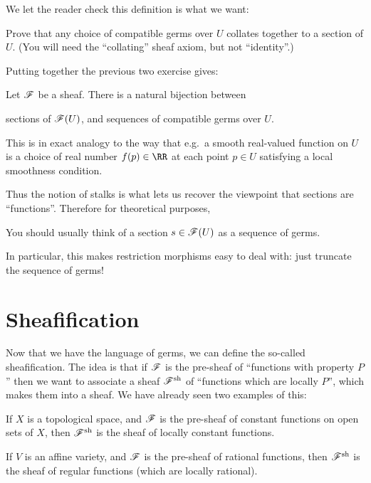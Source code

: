 \documentclass[11pt]{scrreprt}
\begin{document}
We let the reader check this definition is what we want:
\begin{exercise}
	Prove that any choice of compatible germs over $U$
	collates together to a section of $U$.
	(You will need the ``collating'' sheaf axiom, but not ``identity''.)
\end{exercise}

Putting together the previous two exercise gives:
\begin{theorem}
	Let $\mathscr F$ be a sheaf.
	There is a natural bijection between
	\begin{itemize}
		\ii sections of $\mathscr F(U)$, and
		\ii sequences of compatible germs over $U$.
	\end{itemize}
\end{theorem}
This is in exact analogy to the way that e.g.\
a smooth real-valued function on $U$ is a choice
of real number $f(p) \in \RR$ at each point $p \in U$
satisfying a local smoothness condition.

Thus the notion of stalks is what lets us recover the viewpoint
that sections are ``functions''.  Therefore for theoretical purposes,
\begin{moral}
	You should usually think of a section $s \in \mathscr F(U)$ as a sequence of germs.
\end{moral}
In particular, this makes restriction morphisms easy to deal with:
just truncate the sequence of germs!

\section{Sheafification}

Now that we have the language of germs,
we can define the so-called sheafification.
The idea is that if $\mathscr F$ is the pre-sheaf of ``functions with property $P$''
then we want to associate a sheaf $\mathscr F^\mathrm{sh}$ of
``functions which are locally $P$'', which makes them into a sheaf.
We have already seen two examples of this:
\begin{example}
	[Sheafification]
	\listhack
	\begin{enumerate}[(a)]
		\ii If $X$ is a topological space,
		and $\mathscr F$ is the pre-sheaf of constant functions on open sets of $X$,
		then $\mathscr F^\mathrm{sh}$ is the sheaf of locally constant functions.

		\ii If $V$ is an affine variety,
		and $\mathscr F$ is the pre-sheaf of rational functions,
		then $\mathscr F^\mathrm{sh}$ is the sheaf of regular functions
		(which are locally rational).
	\end{enumerate}
\end{example}
\end{document}

